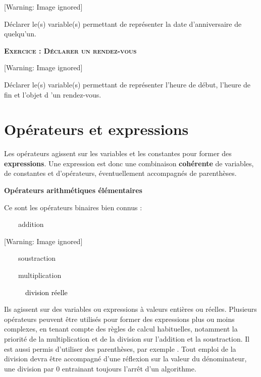 \begin{center}
 [Warning: Image ignored] %

\end{center}
{
Déclarer le(s) variable(s) permettant de représenter la date
d'anniversaire de quelqu'un.}

{\sffamily\bfseries\scshape
Exercice : Déclarer un rendez-vous}

\begin{center}
 [Warning: Image ignored] %

\end{center}
{
Déclarer le(s) variable(s) permettant de représenter
l'heure de début, l'heure de fin et
l'objet d 'un rendez-vous.}

\section{Opérateurs et expressions}
{
Les opérateurs agissent sur les variables et les constantes pour former
des \textbf{expressions}. Une expression est donc une combinaison
\textbf{cohérente} de variables, de constantes et d’opérateurs,
éventuellement accompagnés de parenthèses.}

{\sffamily\bfseries\upshape
Opérateurs arithmétiques élémentaires}

{
Ce sont les opérateurs binaires bien connus : }

{
\textstyleCodeInsr{+}\ \ \ \ addition}

\begin{center}
 [Warning: Image ignored] %

\end{center}
{
\ \ \ \ soustraction}

{
\textstyleCodeInsr{*}\ \ \ \ multiplication}

{
\ \ \textstyleCodeInsr{/}\ \ \ \ \textcolor{black}{division réelle}}

{
Ils agissent sur des variables ou expressions à valeurs entières ou
réelles. Plusieurs opérateurs peuvent être utilisés pour former des
expressions plus ou moins complexes, en tenant compte des règles de
calcul habituelles, notamment la priorité de la multiplication et de la
division sur l’addition et la soustraction. Il est aussi permis
d’utiliser des parenthèses, par exemple . Tout emploi de la division devra être accompagné d’une réflexion
sur la valeur du dénominateur, une division par 0 entrainant toujours
l’arrêt d’un algorithme.}

